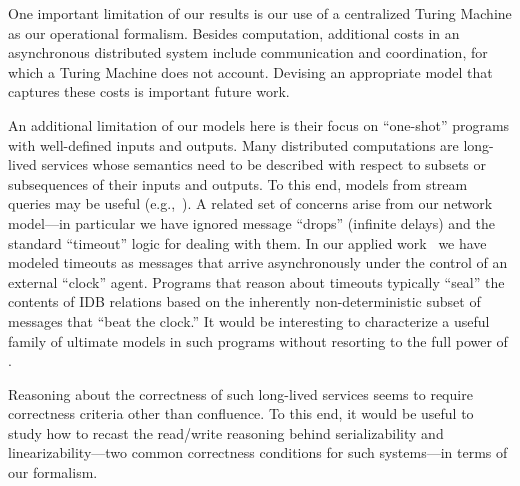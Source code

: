
One important limitation of our results is our use of a centralized Turing Machine as our operational formalism.  Besides computation, additional costs in an asynchronous distributed system include communication and coordination, for which a Turing Machine does not account.  Devising an appropriate model that captures these costs is important future work.

An additional limitation of our models here is their focus on ``one-shot'' programs with well-defined inputs and outputs.  Many distributed computations are long-lived services whose semantics need to be described with respect to subsets or subsequences of their inputs and outputs.  To this end, models from stream queries may be useful (e.g.,~\cite{Chandramouli2009}).  A related set of concerns arise from our network model---in particular we have ignored message ``drops'' (infinite delays) and the standard ``timeout'' logic for dealing with them.  In our applied work~\cite{boom,cidr11} we have modeled timeouts as messages that arrive asynchronously under the control of an external ``clock'' agent.  Programs that reason about timeouts typically ``seal'' the contents of IDB relations based on the inherently non-deterministic subset of messages that ``beat the clock.''  It would be interesting to characterize a useful family of ultimate models in such programs without resorting to the full power of \lang.

Reasoning about the correctness of such long-lived services seems to require correctness criteria other than confluence.  To this end, it would be useful to study how to recast the read/write reasoning behind serializability and linearizability---two common correctness conditions for such systems---in terms of our formalism.

